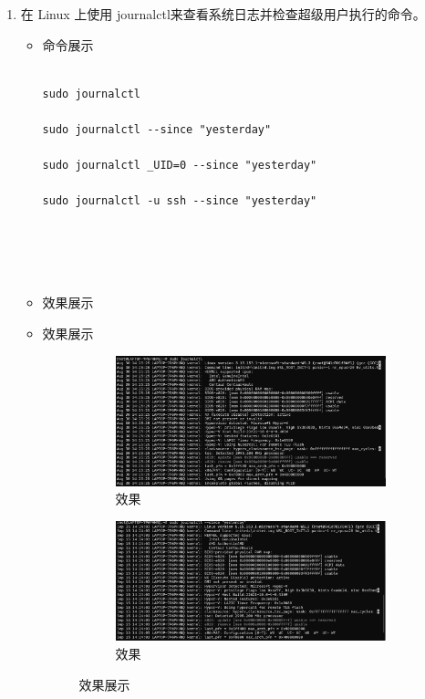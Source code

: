 \documentclass[UTF8]{ctexart}
\begin{document}
\begin{enumerate}
  \item 在 Linux 上使用 journalctl来查看系统日志并检查超级用户执行的命令。
  \begin{itemize}
  \item 命令展示
  \begin{verbatim}

sudo journalctl

sudo journalctl --since "yesterday"

sudo journalctl _UID=0 --since "yesterday"

sudo journalctl -u ssh --since "yesterday"





  \end{verbatim}
\item 效果展示
 \item 效果展示
 \begin{figure}[H]
    \centering
    \begin{subfigure}[b]{0.48\textwidth}
        \includegraphics[width=\textwidth]{111} %
        \caption{效果}
        \label{fig:left}
    \end{subfigure}
    \hfill
    \begin{subfigure}[b]{0.48\textwidth}
        \includegraphics[width=\textwidth]{112} %
        \caption{效果}
        \label{fig:right}
    \end{subfigure}
    \caption{效果展示}
    \label{fig:side_by_side}
\end{figure}


\end{itemize}
\end{enumerate}
\end{document}
